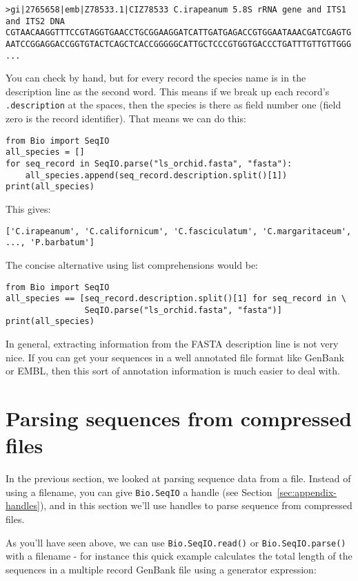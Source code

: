 \begin{verbatim}
>gi|2765658|emb|Z78533.1|CIZ78533 C.irapeanum 5.8S rRNA gene and ITS1 and ITS2 DNA
CGTAACAAGGTTTCCGTAGGTGAACCTGCGGAAGGATCATTGATGAGACCGTGGAATAAACGATCGAGTG
AATCCGGAGGACCGGTGTACTCAGCTCACCGGGGGCATTGCTCCCGTGGTGACCCTGATTTGTTGTTGGG
...
\end{verbatim}

You can check by hand, but for every record the species name is in the description line as the second word.  This means if we break up each record's \verb|.description| at the spaces, then the species is there as field number one (field zero is the record identifier).  That means we can do this:

\begin{verbatim}
from Bio import SeqIO
all_species = []
for seq_record in SeqIO.parse("ls_orchid.fasta", "fasta"):
    all_species.append(seq_record.description.split()[1])
print(all_species)
\end{verbatim}

\noindent This gives:

\begin{verbatim}
['C.irapeanum', 'C.californicum', 'C.fasciculatum', 'C.margaritaceum', ..., 'P.barbatum']
\end{verbatim}

The concise alternative using list comprehensions would be:

\begin{verbatim}
from Bio import SeqIO
all_species == [seq_record.description.split()[1] for seq_record in \
                SeqIO.parse("ls_orchid.fasta", "fasta")]
print(all_species)
\end{verbatim}

In general, extracting information from the FASTA description line is not very nice.
If you can get your sequences in a well annotated file format like GenBank or EMBL,
then this sort of annotation information is much easier to deal with.

\section{Parsing sequences from compressed files}
\label{sec:SeqIO_compressed}
In the previous section, we looked at parsing sequence data from a file.
Instead of using a filename, you can give \verb|Bio.SeqIO| a handle
(see Section~\ref{sec:appendix-handles}), and in this section
we'll use handles to parse sequence from compressed files.

As you'll have seen above, we can use \verb|Bio.SeqIO.read()| or
\verb|Bio.SeqIO.parse()| with a filename - for instance this quick
example calculates the total length of the sequences in a multiple
record GenBank file using a generator expression:

